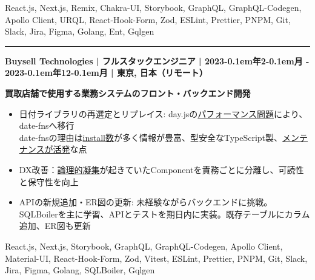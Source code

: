 \documentclass{article}
\begin{document}
\noindent
{}%
\parbox[t]{\dimexpr\linewidth-2em\relax}{
React.js, Next.js, Remix, Chakra-UI, Storybook, GraphQL, GraphQL-Codegen, Apollo Client, URQL, React-Hook-Form, Zod, ESLint, Prettier, PNPM, Git, Slack, Jira, Figma, Golang, Ent, Gqlgen
}

\vspace{0.15em}
\noindent\rule{\linewidth}{0.4pt}
\vspace{0.15em}

\noindent
\textbf{Buysell Technologies | フルスタックエンジニア | 2023\kern-0.1em年2\kern-0.1em月 - 2023\kern-0.1em年12\kern-0.1em月 | 東京, 日本（リモート）}

\vspace{0.15em}

\textbf{買取店舗で使用する業務システムのフロント・バックエンド開発}

\begin{itemize}[leftmargin=1.5em]

  \item 日付ライブラリの再選定とリプレイス: day.jsの\href{https://github.com/iamkun/dayjs/issues/1236}{パフォーマンス問題}により、date-fnsへ移行\\
  date-fnsの理由は\href{https://npmtrends.com/date-fns-vs-dayjs-vs-luxon}{install数}が多く情報が豊富、型安全なTypeScript製、\href{https://github.com/date-fns/date-fns/graphs/contributors}{メンテナンスが活発}な点

  \item DX改善：\href{https://speakerdeck.com/sonatard/coheision-coupling?slide=29}{論理的凝集}が起きていたComponentを責務ごとに分離し、可読性と保守性を向上

  \item APIの新規追加・ER図の更新:
  未経験ながらバックエンドに挑戦。SQLBoilerを主に学習、APIとテストを期日内に実装。既存テーブルにカラム追加、ER図も更新

\end{itemize}

\noindent
{}%
\parbox[t]{\dimexpr\linewidth-2em\relax}{
React.js, Next.js, Storybook, GraphQL, GraphQL-Codegen, Apollo Client, Material-UI, React-Hook-Form, Zod, Vitest, ESLint, Prettier, PNPM, Git, Slack, Jira, Figma, Golang, SQLBoiler, Gqlgen
}
\end{document}
